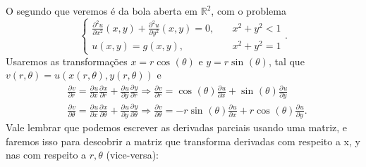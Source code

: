 \documentclass[../pde_notes.tex]{subfiles}
\begin{document}
O segundo que veremos é da bola aberta em \(\mathbb{R}^{2}\), com o problema
\[
	\left\{\begin{array}{ll}
		\frac{\partial^{2}u}{\partial x^{2}}(x,y) + \frac{\partial^{2}u}{\partial y^{2}}(x, y) = 0, & \quad x^{2}+y^{2} < 1 \\
		u(x, y)=g(x,y),                                                                             & \quad x^{2}+y^{2}=1
	\end{array}\right..
\]
Usaremos as transformações \(x = r \cos^{}{(\theta )}\) e \(y = r \sin^{}{(\theta )}\), tal que \(v(r, \theta ) = u(x(r, \theta ), y(r, \theta ))\) e
\begin{align*}
	 & \frac{\partial^{}v}{\partial r^{}} = \frac{\partial^{}u}{\partial x^{}}\frac{\partial^{}x}{\partial r^{}} + \frac{\partial^{}u}{\partial y^{}}\frac{\partial^{}y}{\partial r^{}} \Rightarrow \frac{\partial^{}v}{\partial r^{}}=\cos^{}{(\theta )}\frac{\partial^{}u}{\partial x^{}}+\sin^{}{(\theta )}\frac{\partial^{}u}{\partial y^{}}                                 \\
	 & \frac{\partial^{}v}{\partial \theta ^{}} = \frac{\partial^{}u}{\partial x^{}}\frac{\partial^{}x}{\partial \theta ^{}} + \frac{\partial^{}u}{\partial y^{}}\frac{\partial^{}y}{\partial \theta ^{}} \Rightarrow \frac{\partial^{}v}{\partial \theta ^{}} = -r\sin^{}{(\theta )}\frac{\partial^{}u}{\partial x^{}} + r\cos^{}{(\theta )}\frac{\partial^{}u}{\partial y^{}}.
\end{align*}
Vale lembrar que podemos escrever as derivadas parciais usando uma matriz, e faremos isso para descobrir a matriz que transforma derivadas com respeito a x, y nas com respeito a \(r, \theta \) (vice-versa):
\end{document}
